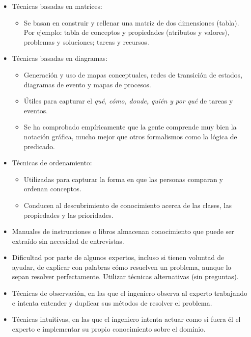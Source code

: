 \documentclass[a4paper,10pt,spanish,oneside]{article}
\begin{document}
\begin{itemize}
\item Técnicas basadas en matrices:

	\begin{itemize}
	\item Se basan en construir y rellenar una matriz de dos dimensiones (tabla). Por 		ejemplo: tabla de conceptos y propiedades (atributos y valores), problemas y 			soluciones; tareas y recursos.
	\end{itemize}

\item Técnicas basadas en diagramas:

	\begin{itemize}
	\item Generación y uso de mapas conceptuales, redes de transición de estados, 			diagramas de evento y mapas de procesos.
	\item Útiles para capturar el \textit{qué, cómo, donde, quién y por qué} de tareas 	y eventos.
	\item Se ha comprobado empíricamente que la gente comprende muy bien la notación 		gráfica, mucho mejor que otros formalismos como la lógica de predicado.
	\end{itemize}
	
\item Técnicas de ordenamiento:

	\begin{itemize}
	\item Utilizadas para capturar la forma en que las personas comparan y ordenan 			conceptos.
	\item Conducen al descubrimiento de conocimiento acerca de las clases, las  			propiedades y las prioridades.
	\end{itemize}

\item Manuales de instrucciones o libros almacenan conocimiento que puede ser extraído sin necesidad de entrevistas.

\item Dificultad por parte de algunos expertos, incluso si tienen voluntad de ayudar, de explicar con palabras cómo resuelven un problema, aunque lo sepan resolver perfectamente. Utilizar técnicas alternativas (sin preguntas).

\item Técnicas de observación, en las que el ingeniero observa al experto trabajando e intenta entender y duplicar sus métodos de resolver el problema.

\item Técnicas intuitivas, en las que el ingeniero intenta actuar como si fuera él el experto e implementar su propio conocimiento sobre el dominio.
\end{itemize}
\end{document}
